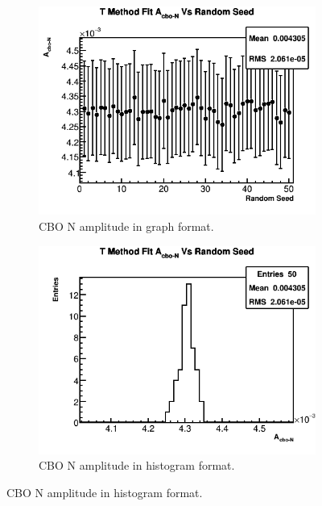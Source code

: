 \begin{figure}[]
	   	\vspace{4mm}
	    \begin{subfigure}[t]{0.45\textwidth}
		    \centering
			\includegraphics[width=\textwidth]{TMethod_A_cbo-N_Vs_Iter_Canv}
		    \caption{CBO N amplitude in graph format.}
	    \end{subfigure}
	    \hspace{4mm}
	    \begin{subfigure}[t]{0.45\textwidth}
		    \centering
			\includegraphics[width=\textwidth]{TMethod_A_cbo-N_Vs_Iter_Canv_hist}
		    \caption{CBO N amplitude in histogram format.}
	    \end{subfigure}%

\end{figure}
